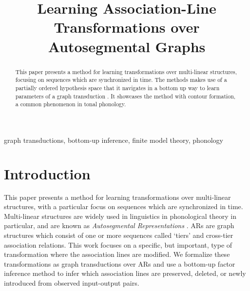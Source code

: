 \documentclass[pmlr]{jmlr}%
\title{Learning Association-Line Transformations over Autosegmental Graphs}
\begin{document}
	
	\maketitle
	
	\begin{abstract}
		This paper presents a method for learning transformations over
		multi-linear structures, focusing on sequences which are
		synchronized in time.  The methods makes use of a partially ordered
		hypothesis space that it navigates in a bottom up way
		\citep{chandleeBufia2019} to learn parameters of a graph
		transduction \citep{CourcelleEngelfriet2012}.
		It showcases the method with contour formation, a
		common phenomenon in tonal phonology.
	\end{abstract}
	\begin{keywords}
		graph transductions, bottom-up inference, finite model theory, phonology
	\end{keywords}
	
	
	\section{Introduction}
	
	This paper presents a method for learning transformations over 
	multi-linear structures, with a particular focus on sequences which 
	are synchronized in time. 
	Multi-linear structures are widely used in linguistics
	in phonological theory in particular, and are known as
	\textit{Autosegmental Representations} 
	\citep[ARs;][]{CG1984autosegmental, goldsmith1976autosegmental,
		hayes1980metrical, sagey1986representation, jardine2017local}.
	ARs are graph structures which consist of one or more sequences called `tiers'
	and cross-tier association relations.
	This work focuses on a specific, but important, type of transformation where the 
	association lines are modified. 
	We formalize these transformations as graph transductions
	\citep{Courcelle1994, EngelfrietHoogeboom2001,
		CourcelleEngelfriet2012} over ARs \citep{jardine2015concatenation, jardine2017local, strother2019diss}
	and use a bottom-up factor inference method 
	\citep{chandleeBufia2019, rawski2021structure, yolyan2025logical} to infer which 
	association lines are preserved, deleted, or newly introduced from 
	observed input-output pairs. 
	
\end{document}
